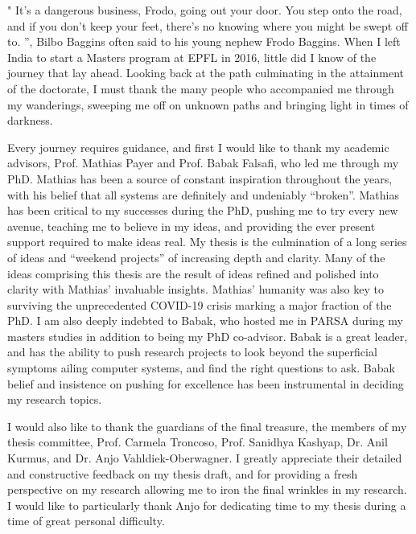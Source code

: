 "
It's a dangerous business, Frodo, going out your door. 
You step onto the road, and if you don't keep your feet, there's no knowing where you might be swept off to.
”, 
Bilbo Baggins often said to his young nephew Frodo Baggins. 
When I left India to start a Masters program at EPFL in 2016,
little did I know of the journey that lay ahead. 
Looking back at the path culminating in the attainment of the doctorate, 
I must thank the many people who accompanied me through my wanderings, 
sweeping me off on unknown paths
and bringing light  in times of darkness.

Every journey requires guidance, and first I would like to thank my academic advisors,
Prof. Mathias Payer and Prof. Babak Falsafi, who led me through my PhD.
Mathias has been a source of constant inspiration throughout the years,
with his belief that all systems are definitely and undeniably ``broken''.
Mathias has been critical to my successes during the PhD, pushing me to try
every new avenue, teaching me to believe in my ideas, and providing the ever present
support required to make ideas real. 
My thesis is the culmination of a long series of ideas and ``weekend projects'' of 
increasing depth and clarity.
Many of the ideas comprising this thesis are the result of ideas refined and
polished into clarity with Mathias' invaluable insights.
Mathias' humanity was also key to surviving the unprecedented COVID-19 crisis
marking a major fraction of the PhD.
I am also deeply indebted to Babak, who hosted me in PARSA during my masters studies
in addition to being my PhD co-advisor. 
Babak is a great leader, and has the ability to push research projects to look beyond the
superficial symptoms ailing computer systems, and find the right questions to ask.
Babak belief and insistence on pushing for excellence has been instrumental in
deciding my research topics.

I would also like to thank the guardians of the final treasure, the members of my
thesis committee, Prof. Carmela Troncoso, Prof. Sanidhya Kashyap, Dr. Anil Kurmus, 
and Dr. Anjo Vahldiek-Oberwagner.
I greatly appreciate their detailed and constructive feedback on my thesis draft,
and for providing a fresh perspective on my research allowing me to iron the final 
wrinkles in my research.
I would like to particularly thank Anjo for dedicating time to my thesis during a
time of great personal difficulty.

